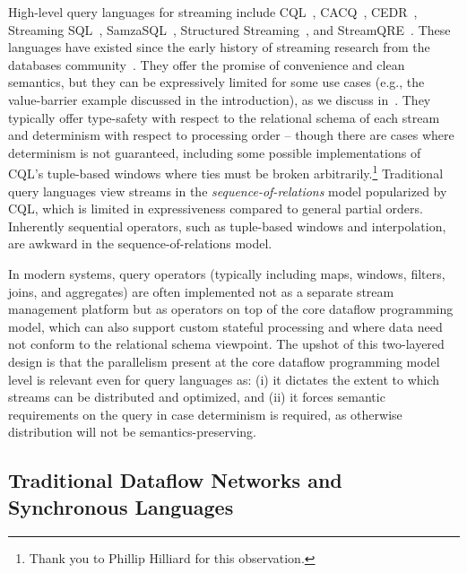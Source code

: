 High-level query languages for streaming include
CQL~\cite{arasu2003cql,ABW2006CQL},
CACQ~\cite{CACQ},
CEDR~\cite{BGAH2007CEDR},
Streaming SQL~\cite{jain2008towards,begoli2019one},
SamzaSQL~\cite{pathirage2016samzasql},
Structured Streaming~\cite{armbrust2018structured},
and StreamQRE~\cite{StreamQRE}.
These languages have existed since the early history
of streaming research from the databases community~\cite{stonebraker20058}.
They offer the promise of convenience and clean semantics, but they can be expressively limited for some use cases (e.g., the value-barrier example discussed in the introduction), as we discuss in~.
They typically offer type-safety with respect to the relational schema of each stream and determinism with respect to processing order --
though there are cases where determinism is not guaranteed, including some possible implementations of CQL's tuple-based windows where ties must be broken arbitrarily.\footnote{Thank you to Phillip Hilliard for this observation.}
Traditional query languages view streams in the \emph{sequence-of-relations} model popularized by CQL, which is limited in expressiveness compared to general partial orders.
Inherently sequential operators, such as tuple-based windows and interpolation, are awkward in the sequence-of-relations model.

In modern systems, query operators (typically including maps, windows, filters, joins, and aggregates)
are often implemented not as a separate stream management platform but as
operators on top of the core dataflow programming model, which can also support custom stateful processing and where data need not conform to the relational schema viewpoint.
The upshot of this two-layered design is that the parallelism present at the core dataflow programming model level is relevant even for query languages as: (i) it dictates the extent to which streams can be distributed and optimized, and (ii) it forces semantic requirements on the query in case determinism is required, as otherwise distribution will not be semantics-preserving.

\subsection{Traditional Dataflow Networks and Synchronous Languages}

